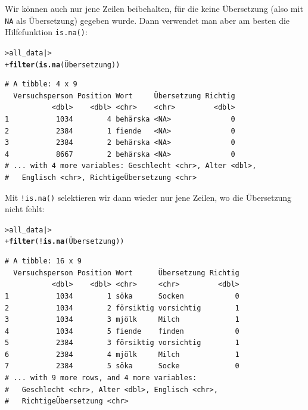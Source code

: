 \documentclass[oneside, 10pt]{book}\usepackage[]{graphicx}\usepackage[]{xcolor}
\makeatletter
\newcommand{\hlopt}[1]{\textcolor[rgb]{0,0,0}{#1}}%
\newcommand{\hlstd}[1]{\textcolor[rgb]{0.345,0.345,0.345}{#1}}%
\newcommand{\hlkwd}[1]{\textcolor[rgb]{0.737,0.353,0.396}{\textbf{#1}}}%
\newenvironment{kframe}{%
 \def\at@end@of@kframe{}%
 \ifinner\ifhmode%
  \def\at@end@of@kframe{\end{minipage}}%
  \begin{minipage}{\columnwidth}%
 \fi\fi%
 \def\FrameCommand##1{\hskip\@totalleftmargin \hskip-\fboxsep
 \colorbox{shadecolor}{##1}\hskip-\fboxsep
     \hskip-\linewidth \hskip-\@totalleftmargin \hskip\columnwidth}%
 \MakeFramed {\advance\hsize-\width
   \@totalleftmargin\z@ \linewidth\hsize
   \@setminipage}}%
 {\par\unskip\endMakeFramed%
 \at@end@of@kframe}
\newenvironment{knitrout}{}{} %
\makeatother
\begin{document}
Wir können auch nur jene Zeilen beibehalten, für die
keine Übersetzung (also mit \texttt{NA} als Übersetzung)
gegeben wurde. Dann verwendet man aber am besten die Hilfefunktion
\texttt{is.na()}:
\begin{knitrout}
\color{fgcolor}\begin{kframe}
\begin{alltt}
\hlstd{> }\hlstd{all_data |>}
\hlstd{+ }  \hlkwd{filter}\hlstd{(}\hlkwd{is.na}\hlstd{(Übersetzung))}
\end{alltt}
\begin{verbatim}
# A tibble: 4 x 9
  Versuchsperson Position Wort     Übersetzung Richtig
           <dbl>    <dbl> <chr>    <chr>         <dbl>
1           1034        4 behärska <NA>              0
2           2384        1 fiende   <NA>              0
3           2384        2 behärska <NA>              0
4           8667        2 behärska <NA>              0
# ... with 4 more variables: Geschlecht <chr>, Alter <dbl>,
#   Englisch <chr>, RichtigeÜbersetzung <chr>
\end{verbatim}
\end{kframe}
\end{knitrout}

Mit \texttt{!is.na()} selektieren wir dann wieder nur jene Zeilen,
wo die Übersetzung nicht fehlt:
\begin{knitrout}
\color{fgcolor}\begin{kframe}
\begin{alltt}
\hlstd{> }\hlstd{all_data |>}
\hlstd{+ }  \hlkwd{filter}\hlstd{(}\hlopt{!}\hlkwd{is.na}\hlstd{(Übersetzung))}
\end{alltt}
\begin{verbatim}
# A tibble: 16 x 9
  Versuchsperson Position Wort      Übersetzung Richtig
           <dbl>    <dbl> <chr>     <chr>         <dbl>
1           1034        1 söka      Socken            0
2           1034        2 försiktig vorsichtig        1
3           1034        3 mjölk     Milch             1
4           1034        5 fiende    finden            0
5           2384        3 försiktig vorsichtig        1
6           2384        4 mjölk     Milch             1
7           2384        5 söka      Socke             0
# ... with 9 more rows, and 4 more variables:
#   Geschlecht <chr>, Alter <dbl>, Englisch <chr>,
#   RichtigeÜbersetzung <chr>
\end{verbatim}
\end{kframe}
\end{knitrout}
\end{document}
